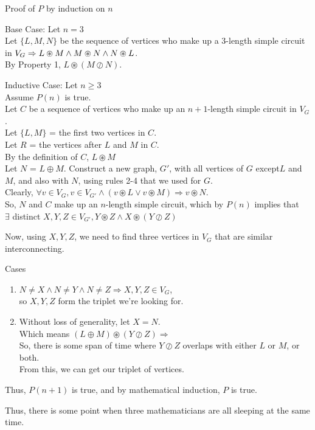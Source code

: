 \documentclass[fleqn]{article}
\begin{document}
Proof of $P$ by induction on $n$

Base Case: Let $n = 3$\\
Let $\lbrace L, M, N \rbrace$ be the sequence of vertices who make up a 3-length simple circuit in $V_G \Rightarrow\\
L \circledast M \wedge M \circledast N \wedge N \circledast L$.\\
By Property 1, $L \circledast (M \oslash N)$.

Inductive Case: Let $n \geq 3$\\
Assume $P(n)$ is true.\\
Let $C$ be a sequence of vertices who make up an $n+1$-length simple circuit in $V_G$.\\
Let $\lbrace L,M \rbrace$ = the first two vertices in $C$.\\
Let $R$ = the vertices after $L$ and $M$ in $C$.\\
By the definition of $C$, $L \circledast M$\\
Let $N$ = $L \oplus M$.
Construct a new graph, $G'$, with all vertices of $G$ except$L$ and $M$, and also with $N$, using rules 2-4 that we used for $G$.\\
Clearly, $\forall v \in V_G, v \in V_{G'} \wedge 
                             (v \circledast L \vee v \circledast M)
          \Rightarrow v \circledast N$.\\
So, $N$ and $C$ make up an $n$-length simple circuit, which by $P(n)$ implies that\\
$\exists$ distinct $X,Y,Z \in V_{G'},
              Y \circledast Z \wedge
              X \circledast (Y \oslash Z)$

Now, using $X,Y,Z$, we need to find three vertices in $V_G$ that are similar interconnecting.

Cases
\begin{enumerate}
  \item $N \not= X \wedge N \not= Y \wedge N \not= Z \Rightarrow
        X,Y,Z \in V_G$,\\
        so $X,Y,Z$ form the triplet we're looking for.

  \item Without loss of generality, let $X = N$.\\
        Which means $(L \oplus M) \circledast (Y \oslash Z) \Rightarrow$\\
        So, there is some span of time where $Y \oslash Z$ overlaps
        with either $L$ or $M$, or both.\\
        From this, we can get our triplet of vertices.
\end{enumerate}
Thus, $P(n+1)$ is true, and by mathematical induction, $P$ is true.

Thus, there is some point when three mathematicians are all sleeping at the same time.
\end{document}

